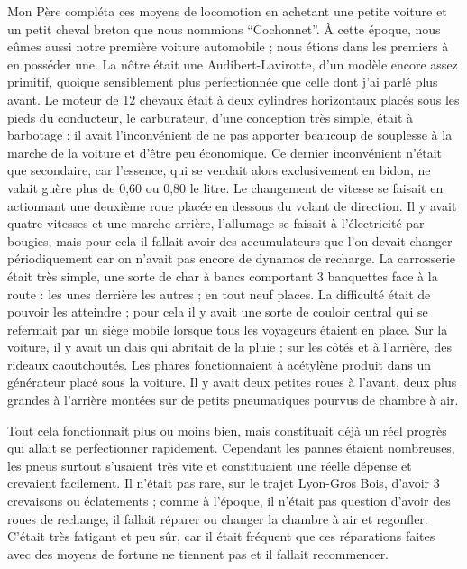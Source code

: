 \documentclass[11pt,a4paper]{report}
\begin{document}
Mon Père compléta ces moyens de locomotion en achetant une petite voiture et un petit cheval breton que nous nommions ``Cochonnet''. À cette époque, nous eûmes aussi notre première voiture automobile ; nous étions dans les premiers à en posséder une. La nôtre était une Audibert-Lavirotte, d'un modèle encore assez primitif, quoique sensiblement plus perfectionnée que celle dont j'ai parlé plus avant. Le moteur de 12 chevaux était à deux cylindres horizontaux placés sous les pieds du conducteur, le carburateur, d'une conception très simple, était à barbotage ; il avait l'inconvénient de ne pas apporter beaucoup de souplesse à la marche de la voiture et d'être peu économique. Ce dernier inconvénient n'était que secondaire, car l'essence, qui se vendait alors exclusivement en bidon, ne valait guère plus de 0,60 ou 0,80 le litre. Le changement de vitesse se faisait en actionnant une deuxième roue placée en dessous du volant de direction. Il y avait quatre vitesses et une marche arrière, l'allumage se faisait à l'électricité par bougies, mais pour cela il fallait avoir des accumulateurs que l'on devait changer périodiquement car on n'avait pas encore de dynamos de recharge. La carrosserie était très simple, une sorte de char à bancs comportant 3 banquettes face à la route : les unes derrière les autres ; en tout neuf places. La difficulté était de pouvoir les atteindre ; pour cela il y avait une sorte de couloir central qui se refermait par un siège mobile lorsque tous les voyageurs étaient en place. Sur la voiture, il y avait un dais qui abritait de la pluie ; sur les côtés et à l'arrière, des rideaux caoutchoutés. Les phares fonctionnaient à acétylène produit dans un générateur placé sous la voiture. Il y avait deux petites roues à l'avant, deux plus grandes à l'arrière montées sur de petits pneumatiques pourvus de chambre à air.

Tout cela fonctionnait plus ou moins bien, mais constituait déjà un réel progrès qui allait se perfectionner rapidement. Cependant les pannes étaient nombreuses, les pneus surtout s'usaient très vite et constituaient une réelle dépense et crevaient facilement. Il n'était pas rare, sur le trajet Lyon-Gros Bois, d'avoir 3 crevaisons ou éclatements ; comme à l'époque, il n'était pas question d'avoir des roues de rechange, il fallait réparer ou changer la chambre à air et regonfler. C'était très fatigant et peu sûr, car il était fréquent que ces réparations faites avec des moyens de fortune ne tiennent pas et il fallait recommencer.
\end{document}
